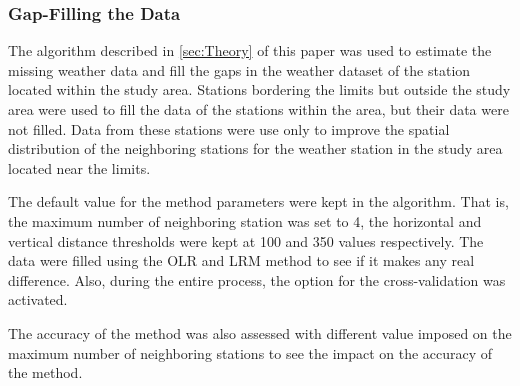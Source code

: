\documentclass[TechnicalNoteMeteo.tex]{subfiles}
\begin{document}
\subsubsection{Gap-Filling the Data}
The algorithm described in \cref{sec:Theory} of this paper was used to estimate the missing weather data and fill the gaps in the weather dataset of the station located within the study area. Stations bordering the limits but outside the study area were used to fill the data of the stations within the area, but their data were not filled. Data from these stations were use only to improve the spatial distribution of the neighboring stations for the weather station in the study area located near the limits.

The default value for the method parameters were kept in the algorithm. That is, the maximum number of neighboring station was set to 4, the horizontal and vertical distance thresholds were kept at 100 and 350 values respectively. The data were filled using the OLR and LRM method to see if it makes any real difference. Also, during the entire process, the option for the cross-validation was activated.

The accuracy of the method was also assessed with different value imposed on the maximum number of neighboring stations to see the impact on the accuracy of the method.
\end{document}
